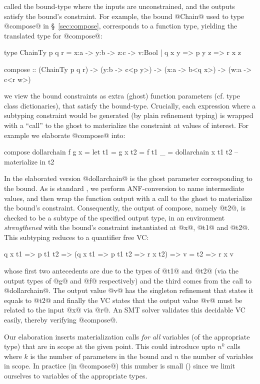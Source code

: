  called the
bound-type where the inputs are unconstrained, and the
outputs satisfy the bound's constraint.
%
For example, the bound @Chain@ used to type @compose@ in
\S~\ref{sec:compose}, corresponds to a function type, yielding
the translated type for @compose@:
%
\begin{code}
  type ChainTy p q r
    =  x:a -> y:b -> z:c -> {v:Bool | q x y => p y z => r x z}

  compose :: (ChainTy p q r) 
          -> (y:b -> c<p y>)
          -> (x:a -> b<q x>)
          -> (w:a -> c<r w>)
\end{code}

 we view the bound constraints
as extra (ghost) function parameters (cf. type class dictionaries),
that satisfy the bound-type. Crucially, each expression where a
subtyping constraint would be generated (by plain refinement typing)
is wrapped with a ``call'' to the ghost to materialize the constraint
at values of interest. For example we elaborate @compose@ into:
%
\begin{code}
  compose dollarchain f g x =
    let t1 = g x
        t2 = f t1
        _  = dollarchain x t1 t2   -- materialize
    in  t2
\end{code}
%
In the elaborated version @dollarchain@ is the ghost parameter %
corresponding to the bound. As is standard \cite{LiquidPLDI08},
we perform ANF-conversion to name intermediate values, and then
wrap the function output with a call to the ghost to materialize
the bound's constraint. Consequently, the output of compose, namely
@t2@, is checked to be a subtype of the specified output type,
in an environment \emph{strengthened} with the bound's constraint
instantiated at @x@, @t1@ and @t2@. This subtyping reduces to a
quantifier free VC:
%
\begin{code}
      q x t1
  =>  p t1 t2
  => (q x t1 => p t1 t2 => r x t2)
  =>  v = t2 => r x v
\end{code}
%
whose first two antecedents are due to the types of @t1@ and @t2@
(via the output types of @g@ and @f@ respectively) and the third
comes from the call to @dollarchain@.
%
The output value @v@ has the singleton refinement that
states it equals to @t2@ and finally the VC states that the
output value @v@ must be related to the input @x@ via @r@.
%
An SMT solver validates this decidable VC easily, thereby
verifying @compose@.

Our elaboration inserts materialization calls \emph{for all}
variables (of the appropriate type) that are in scope at the
given point. This could introduce upto $n^k$ calls where $k$
is the number of parameters in the bound and $n$ the number
of variables in scope. In practice (\eg in @compose@) this
number is small () since we limit ourselves to variables
of the appropriate types.

